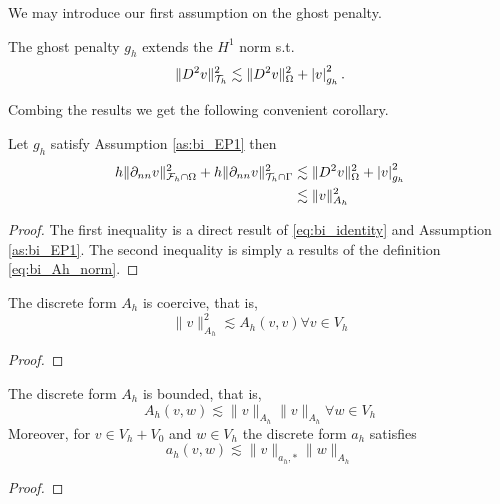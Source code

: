 We may introduce our first assumption on the ghost penalty.
\begin{assumption}[EP1]
    \label{as:bi_EP1}
    The ghost penalty $g_{h}$ extends the $H^{1}$ norm s.t. \[
    \| D^2 v \|_{ \mathcal{T} _{h} }^{ 2 } \lesssim  \| D^2 v \|_{ \Omega  }^{ 2 } + \left\lvert  v  \right\rvert _{g_{h}}^{2}.
    \]
\end{assumption}


Combing the results we get the following convenient corollary.


\begin{corollary}
    Let $g_{h}$ satisfy Assumption \ref{as:bi_EP1} then
    \[
        \begin{split}
            h\| \partial _{nn}  v \|_{ \mathcal{F}_h \cap \Omega    }^{2 } + h\| \partial _{nn} v \|_{ \mathcal{T} _{h} \cap \Gamma  }^{2  } &  \lesssim  \| D^2 v \|_{ \Omega  }^{ 2 } + \left\lvert  v  \right\rvert _{g_{h}}^{2} \\
            &  \lesssim \| v \|_{ A_{h} }^{  2}
        \end{split}
    \]
\end{corollary}
\begin{proof}
    The first inequality is a direct result of \eqref{eq:bi_identity} and Assumption \ref{as:bi_EP1}. The second inequality is simply a results of the definition \eqref{eq:bi_Ah_norm}.
\end{proof}


\begin{lemma}
    The discrete form $A_{h}$ is coercive, that is, \[
    \| v \|_{ A_{h} }^{ 2 }  \lesssim A_{h}( v,v) \forall v \in V_{h}
    \]
\end{lemma}

\begin{proof}
\end{proof}

\begin{lemma}
    The discrete form $A_{h}$ is bounded, that is, \[
     A_{h}( v,w) \lesssim \| v \|_{A_{h}  }^{  }\| v \|_{A_{h}  }^{  }  \forall w \in V_{h}
    \]
    Moreover, for $v \in V_{h} + V_{0}$  and $w \in V_{h}$ the discrete form $a_{h}$ satisfies   \[
    a_{h} ( v,w) \lesssim \| v \|_{ a_{h},* }^{  } \| w \|_{ A_{h} }^{  }
    \]
\end{lemma}

\begin{proof}
\end{proof}

